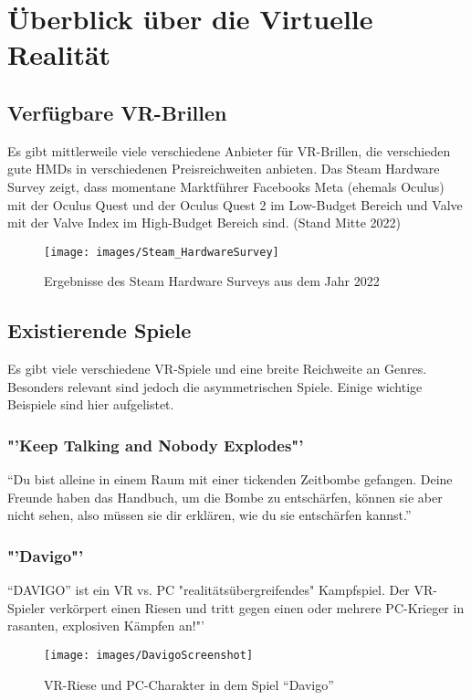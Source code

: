 \chapter{Überblick über die Virtuelle Realität}


\section{Verfügbare VR-Brillen}
Es gibt mittlerweile viele verschiedene Anbieter für VR-Brillen, die verschieden gute HMDs in verschiedenen Preisreichweiten anbieten.
Das Steam Hardware Survey zeigt, dass momentane Marktführer Facebooks Meta (ehemals Oculus) mit der Oculus Quest und der Oculus Quest 2 im Low-Budget Bereich und Valve mit der Valve Index im High-Budget Bereich sind. (Stand Mitte 2022)


\begin{figure}[H]
	\centering
	\texttt{[image: images/Steam\_HardwareSurvey]}
	\caption{Ergebnisse des Steam Hardware Surveys aus dem Jahr 2022\cite{_steam_hardware}}
\end{figure}

\section{Existierende Spiele}
Es gibt viele verschiedene VR-Spiele und eine breite Reichweite an Genres. Besonders relevant sind jedoch die asymmetrischen Spiele. Einige wichtige Beispiele sind hier aufgelistet.

\subsection{"'Keep Talking and Nobody Explodes"'}
"`Du bist alleine in einem Raum mit einer tickenden Zeitbombe gefangen. Deine Freunde haben das Handbuch, um die Bombe zu entschärfen, können sie aber nicht sehen, also müssen sie dir erklären, wie du sie entschärfen kannst."'
\cite{_steam_keeptalking}

\subsection{"'Davigo"'}
"`DAVIGO"' ist ein VR vs. PC "realitätsübergreifendes" Kampfspiel. Der VR-Spieler verkörpert einen Riesen und tritt gegen einen oder mehrere PC-Krieger in rasanten, explosiven Kämpfen an!"'
\cite{_steam_davigo}

\begin{figure}[H]
	\centering
	\texttt{[image: images/DavigoScreenshot]}
	\caption{VR-Riese und PC-Charakter in dem Spiel "`Davigo"'\cite{_steam_davigo}}
\end{figure}

